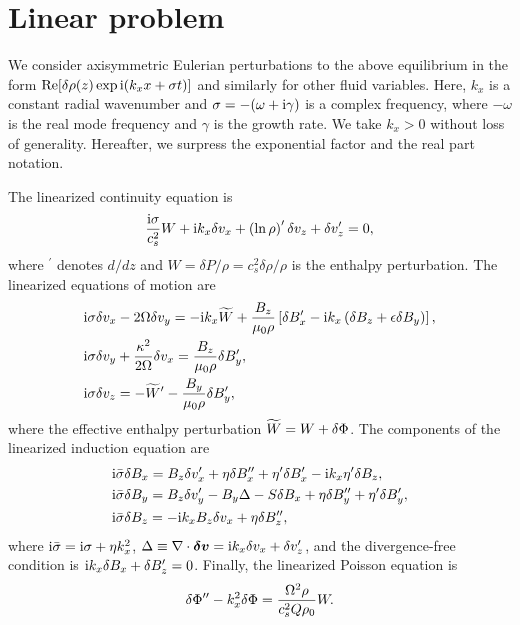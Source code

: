 \section{Linear problem}\label{linear}
We consider axisymmetric Eulerian perturbations to the above
equilibrium in the form $\operatorname{Re}[\delta\rho(z)\exp{\mathrm{i}(k_xx + \sigma
    t)}]$ and similarly for other fluid variables. Here, $k_x$ is a
constant radial wavenumber and $\sigma=-(\omega +\mathrm{i}\gamma)$ is a
complex  frequency, where $-\omega$ is the real mode frequency and $\gamma$ is
the growth rate. We take $k_x>0$ without loss of generality. 
Hereafter, we surpress the exponential factor and the real part notation. 

The linearized continuity equation is 
\begin{align}
  \frac{\mathrm{i}\sigma}{c_s^2}W + \mathrm{i} k_x \delta v_x
  +\left(\ln\rho\right)^\prime\delta v_z + \delta v_z^\prime = 0,\label{lin_cont}
\end{align}
where $^\prime$ denotes $d/dz$ and $W=\delta P/\rho =
c_s^2\delta\rho/\rho$ is the enthalpy perturbation.  
The linearized equations of motion are
\begin{align}
  &\mathrm{i}\sigma \delta v_x - 2\Omega\delta v_y  = - \mathrm{i}
  k_x\widetilde{W} + \frac{B_z}{\mu_0\rho} \left[\delta B_x^\prime - \mathrm{i} 
    k_x\left(\delta B_z + \epsilon\delta B_y\right)\right],\\
  &\mathrm{i}\sigma\delta v_y + 
    \frac{\kappa^2}{2\Omega}\delta v_x = \frac{B_z}{\mu_0\rho}\delta B_y^\prime\label{lin_vy},\\ 
  & \mathrm{i}\sigma\delta v_z = -\widetilde{W}^\prime - \frac{B_y}{\mu_0\rho}\delta B_y^\prime\label{lin_vz},  
\end{align}
where the effective enthalpy perturbation
$\widetilde{W} = W + \delta \Phi$. The components of the linearized induction equation
are 
\begin{align}
&  \mathrm{i}\bar{\sigma}\delta B_x = B_z\delta v_x^\prime +
  \eta\delta B_x^{\prime\prime}+\eta^\prime\delta B_x^\prime - \mathrm{i} k_x
  \eta^\prime \delta B_z,\label{induct_x}\\
&\mathrm{i}\bar{\sigma}\delta B_y = B_z\delta v_y^\prime -B_y\Delta - S\delta B_x +
  \eta\delta B_y^{\prime\prime}+\eta^\prime\delta B_y^\prime,\label{induct_y}\\
& \mathrm{i}\bar{\sigma}\delta B_z = -\mathrm{i}  k_xB_z \delta v_x +
\eta\delta B_z^{\prime\prime}, \label{induct_vert}
\end{align} 
where $\mathrm{i}\bar{\sigma} = \mathrm{i}\sigma + \eta k_x^2$,
$\Delta\equiv \nabla\cdot\bm{\delta v}  = \mathrm{i} k_x\delta v_x + \delta v_z^\prime$,   
and the divergence-free condition is $\mathrm{i} k_x\delta B_x +
\delta B_z^\prime=0$. Finally, the linearized Poisson equation is 
\begin{align}
  \delta \Phi^{\prime\prime} - k_x^2\delta \Phi = \frac{\Omega^2\rho}{c_s^2Q\rho_0}W.  \label{lin_poisson}
\end{align}

